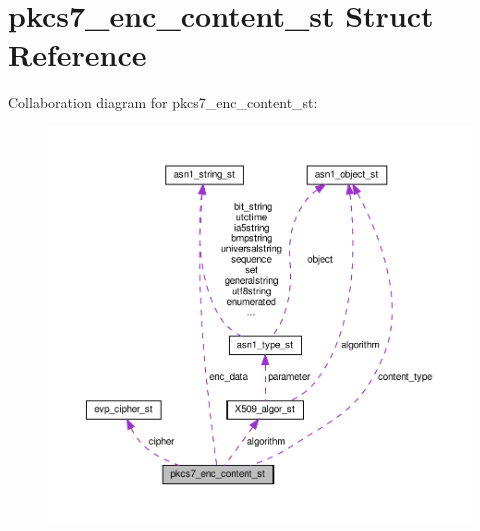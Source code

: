 \hypertarget{structpkcs7__enc__content__st}{}\section{pkcs7\+\_\+enc\+\_\+content\+\_\+st Struct Reference}
\label{structpkcs7__enc__content__st}


Collaboration diagram for pkcs7\+\_\+enc\+\_\+content\+\_\+st\+:
\nopagebreak
\begin{figure}[H]
\begin{center}
\leavevmode
\includegraphics[width=350pt]{structpkcs7__enc__content__st__coll__graph}
\end{center}
\end{figure}
